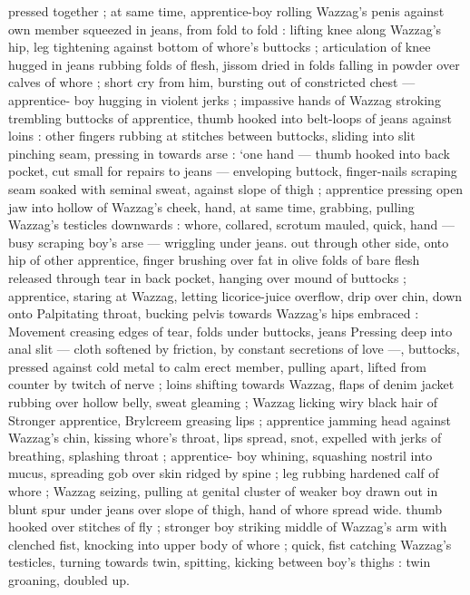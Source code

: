 pressed together ; at same time, apprentice-boy rolling Wazzag's 
penis against own member squeezed in jeans, from fold to fold : 
lifting knee along Wazzag's hip, leg tightening against bottom of 
whore's buttocks ; articulation of knee hugged in jeans rubbing folds 
of flesh, jissom dried in folds falling in powder over calves of whore 
; short cry from him, bursting out of constricted chest --- apprentice- 
boy hugging in violent jerks ; impassive hands of Wazzag stroking 
trembling buttocks of apprentice, thumb hooked into belt-loops of 
jeans against loins : other fingers rubbing at stitches between 
buttocks, sliding into slit pinching seam, pressing in towards arse : 
‘one hand --- thumb hooked into back pocket, cut small for repairs to 
jeans --- enveloping buttock, finger-nails scraping seam soaked with 
seminal sweat, against slope of thigh ; apprentice pressing open jaw 
into hollow of Wazzag's cheek, hand, at same time, grabbing, pulling 
Wazzag's testicles downwards : whore, collared, scrotum mauled, 
quick, hand --- busy scraping boy's arse --- wriggling under jeans. 
out through other side, onto hip of other apprentice, finger brushing 
over fat in olive folds of bare flesh released through tear in back 
pocket, hanging over mound of buttocks ; apprentice, staring at 
Wazzag, letting licorice-juice overflow, drip over chin, down onto 
Palpitating throat, bucking pelvis towards Wazzag's hips embraced : 
Movement creasing edges of tear, folds under buttocks, jeans 
Pressing deep into anal slit --- cloth softened by friction, by constant 
secretions of love ---, buttocks, pressed against cold metal to calm 
erect member, pulling apart, lifted from counter by twitch of nerve ; 
loins shifting towards Wazzag, flaps of denim jacket rubbing over 
hollow belly, sweat gleaming ; Wazzag licking wiry black hair of 
Stronger apprentice, Brylcreem greasing lips ; apprentice jamming 
head against Wazzag's chin, kissing whore's throat, lips spread, 
snot, expelled with jerks of breathing, splashing throat ; apprentice- 
boy whining, squashing nostril into mucus, spreading gob over skin 
ridged by spine ; leg rubbing hardened calf of whore ; Wazzag 
seizing, pulling at genital cluster of weaker boy drawn out in blunt 
spur under jeans over slope of thigh, hand of whore spread wide. 
thumb hooked over stitches of fly ; stronger boy striking middle of 
Wazzag's arm with clenched fist, knocking into upper body of whore 
; quick, fist catching Wazzag's testicles, turning towards twin, 
spitting, kicking between boy's thighs : twin groaning, doubled up. 

